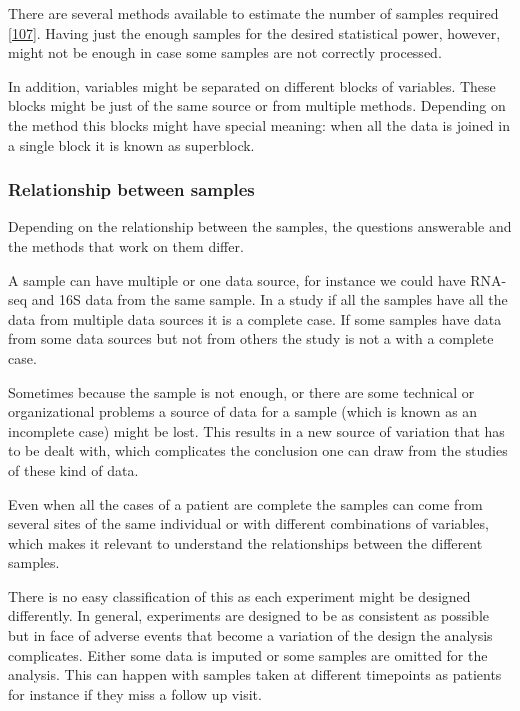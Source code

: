 \documentclass[
  a4paper,
]{book}
\begin{document}
There are several methods available to estimate the number of samples required {[}\protect\hyperlink{ref-tarazona2020}{107}{]}.
Having just the enough samples for the desired statistical power, however, might not be enough in case some samples are not correctly processed.

In addition, variables might be separated on different blocks of variables.
These blocks might be just of the same source or from multiple methods.
Depending on the method this blocks might have special meaning: when all the data is joined in a single block it is known as superblock.

\hypertarget{relationship-between-samples}{%
\subsubsection{Relationship between samples}\label{relationship-between-samples}}

Depending on the relationship between the samples, the questions answerable and the methods that work on them differ.

A sample can have multiple or one data source, for instance we could have RNA-seq and 16S data from the same sample.
In a study if all the samples have all the data from multiple data sources it is a complete case.
If some samples have data from some data sources but not from others the study is not a with a complete case.

Sometimes because the sample is not enough, or there are some technical or organizational problems a source of data for a sample (which is known as an incomplete case) might be lost.
This results in a new source of variation that has to be dealt with, which complicates the conclusion one can draw from the studies of these kind of data.

Even when all the cases of a patient are complete the samples can come from several sites of the same individual or with different combinations of variables, which makes it relevant to understand the relationships between the different samples.

There is no easy classification of this as each experiment might be designed differently.
In general, experiments are designed to be as consistent as possible but in face of adverse events that become a variation of the design the analysis complicates.
Either some data is imputed or some samples are omitted for the analysis.
This can happen with samples taken at different timepoints as patients for instance if they miss a follow up visit.
\end{document}

